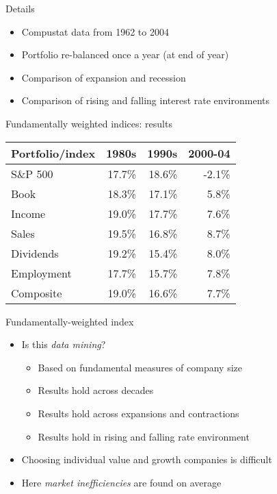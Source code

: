 \documentclass[14pt,xcolor=pdftex,dvipsnames,table]{beamer}\usepackage[]{graphicx}\usepackage[]{color}
\begin{document}
\begin{frame}{Details}
\begin{itemize}[<+-| alert@+>]
\item Compustat data from 1962 to 2004
\item Portfolio re-balanced once a year (at end of year)
\item Comparison of expansion and recession
\item Comparison of rising and falling interest rate environments
\end{itemize}
\end{frame}

\begin{frame}{Fundamentally weighted indices: results}
\begin{table}
\begin{center}
\begin{tabular}{l r r r}
\textbf{Portfolio/index} & \textbf{1980s} & \textbf{1990s} & \textbf{2000-04}\\
\hline
S\&P 500 & 17.7\% & 18.6\% & -2.1\% \\
Book & 18.3\%     & 17.1\% & 5.8\%\\
Income & 19.0\%   & 17.7\% & 7.6\% \\
Sales & 19.5\%    & 16.8\% & 8.7\% \\
Dividends & 19.2\% & 15.4\% & 8.0\% \\
Employment & 17.7\% & 15.7\% & 7.8\%\\
Composite & 19.0\% & 16.6\% & 7.7\% 
\end{tabular}
\end{center}
\end{table}
\end{frame}

\begin{frame}{Fundamentally-weighted index}
\begin{itemize}[<+-| alert@+>]
\item Is this \emph{data mining}?
\begin{itemize}
\item Based on fundamental measures of company size
\item Results hold across decades 
\item Results hold across expansions and contractions
\item Results hold in rising and falling rate environment
\end{itemize}
\item Choosing individual value and growth companies is difficult
\item Here \emph{market inefficiencies} are found on average
\end{itemize}
\end{frame}
\end{document}
